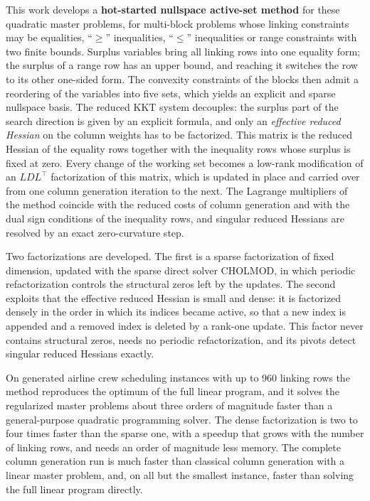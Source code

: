 \documentclass[11pt, openany]{book}
\theoremstyle{definition}
\begin{document}
This work develops a \textbf{hot-started nullspace active-set method} for these quadratic
master problems, for multi-block problems whose linking constraints may be equalities,
``$\ge$'' inequalities, ``$\le$'' inequalities or range constraints with two finite bounds.
Surplus variables bring all linking rows into one equality form; the surplus of a range row
has an upper bound, and reaching it switches the row to its other one-sided form. The convexity constraints of the blocks then admit a
reordering of the variables into five sets, which yields an explicit and sparse nullspace
basis. The reduced KKT system decouples: the surplus part of the search direction is given
by an explicit formula, and only an \emph{effective reduced Hessian} on the column weights
has to be factorized. This matrix is the reduced Hessian of the equality rows together with
the inequality rows whose surplus is fixed at zero. Every change of the working set becomes
a low-rank modification of an $LDL^\top$ factorization of this matrix, which is updated in
place and carried over from one column generation iteration to the next. The Lagrange
multipliers of the method coincide with the reduced costs of column generation and with the
dual sign conditions of the inequality rows, and singular reduced Hessians are resolved by
an exact zero-curvature step.

\medskip

Two factorizations are developed. The first is a sparse factorization of fixed dimension,
updated with the sparse direct solver CHOLMOD, in which periodic refactorization controls the
structural zeros left by the updates. The second exploits that the effective reduced Hessian
is small and dense: it is factorized densely in the order in which its indices became active,
so that a new index is appended and a removed index is deleted by a rank-one update. This
factor never contains structural zeros, needs no periodic refactorization, and its pivots
detect singular reduced Hessians exactly.

\medskip

On generated airline crew scheduling instances with up to 960 linking rows the method
reproduces the optimum of the full linear program, and it solves the regularized master
problems about three orders of magnitude faster than a general-purpose quadratic programming
solver. The dense factorization is two to four times faster than the sparse one, with a
speedup that grows with the number of linking rows, and needs an order of magnitude less
memory. The complete column generation run is much faster than classical column generation
with a linear master problem, and, on all but the smallest instance, faster than solving the
full linear program directly.
\end{document}
